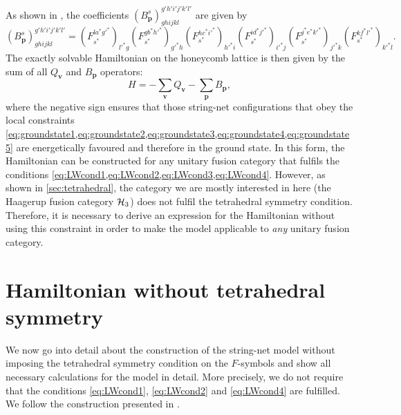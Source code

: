 As shown in \cite{Levin2005}, the coefficients $\left(B_\mathbf{p}^s\right)_{ghijkl}^{g'h'i'j'k'l'}$ are given by 
	\begin{equation}
	\label{eq:LWoriginal}
		\left(B_\mathbf{p}^s\right)_{ghijkl}^{g'h'i'j'k'l'}=\left(F_{s^*}^{la^*g'^*}\right)_{l'^* g}\left(F_{s^*}^{gb^*h'^*}\right)_{g'^* h}\left(F_{s^*}^{hc^*i'^*}\right)_{h'^* i}\left(F_{s^*}^{id^*j'^*}\right)_{i'^* j}\left(F_{s^*}^{j^*e^*k'^*}\right)_{j'^* k}\left(F_{s^*}^{kf^*l'^*}\right)_{k'^* l}.
	\end{equation}
The exactly solvable Hamiltonian on the honeycomb lattice is then given by the sum of all $Q_\mathbf{v}$ and $B_\mathbf{p}$ operators:
	\begin{equation}
		H=-\sum_\mathbf{v}Q_\mathbf{v}-\sum_\mathbf{p}B_\mathbf{p},
	\end{equation}	
where the negative sign ensures that those string-net configurations that obey the local constraints \cref{eq:groundstate1,eq:groundstate2,eq:groundstate3,eq:groundstate4,eq:groundstate5} are energetically favoured and therefore in the ground state. In this form, the Hamiltonian can be constructed for any unitary fusion category that fulfils the conditions \cref{eq:LWcond1,eq:LWcond2,eq:LWcond3,eq:LWcond4}. However, as shown in \cref{sec:tetrahedral}, the category we are mostly interested in here (the Haagerup fusion category ${\mathcal{H}_3}$) does not fulfil the tetrahedral symmetry condition. Therefore, it is necessary to derive an expression for the Hamiltonian without using this constraint in order to make the model applicable to \emph{any} unitary fusion category.


\section{Hamiltonian without tetrahedral symmetry}

We now go into detail about the construction of the string-net model without imposing the tetrahedral symmetry condition on the $F$-symbols and show all necessary calculations for the model in detail. More precisely, we do not require that the conditions \cref{eq:LWcond1}, \cref{eq:LWcond2} and \cref{eq:LWcond4} are fulfilled. We follow the construction presented in \cite{Hahn2020}.

